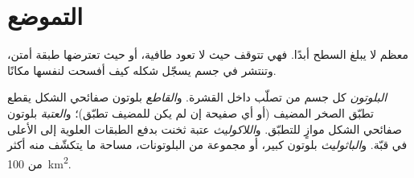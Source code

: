 \section{التموضع}

معظم  لا يبلغ السطح أبدًا. فهي تتوقف حيث لا تعود طافية،
أو حيث تعترضها طبقة أمتن، وتنتشر في جسم يسجّل شكله
كيف أفسحت لنفسها مكانًا.

\begin{definition}\label{def:b2:magma-emplacement:bodies}
\emph{البلوتون} كل جسم من  تصلّب داخل
القشرة. و\emph{القاطع} بلوتون صفائحي الشكل يقطع
تطبّق الصخر المضيف (أو أي صفيحة إن لم يكن للمضيف تطبّق)؛
و\emph{العتبة} بلوتون صفائحي الشكل موازٍ للتطبّق.
و\emph{اللاكوليث} عتبة ثخنت بدفع الطبقات
العلوية إلى الأعلى في قبّة. و\emph{الباثوليث} بلوتون كبير،
أو مجموعة من البلوتونات، مساحة ما يتكشّف منه أكثر من \qty{100}{km^2}.
\end{definition}

